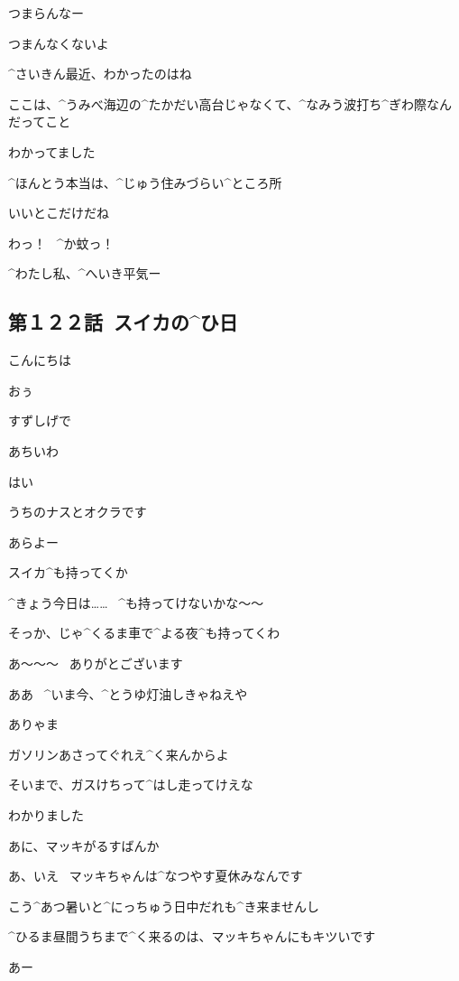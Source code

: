\Shiba つまらんなー

\Kokone つまんなくないよ

\page[17]
\Alpha ^{さいきん}{最近}、わかったのはね

\Alpha ここは、^{うみべ}{海辺}の^{たかだい}{高台}じゃなくて、^{なみう}{波打}ち^{ぎわ}{際}なんだってこと

\Makki わかってました

\Alpha ^{ほんとう}{本当}は、^{じゅう}{住}みづらい^{ところ}{所}

\Makki いいとこだけだね

\page
\Makki わっ！
\ ^{か}{蚊}っ！

\Alpha ^{わたし}{私}、^{へいき}{平気}ー


\subsection{第１２２話\ スイカの^{ひ}{日}}

\page[21]
\Alpha こんにちは

\Ojisan おぅ

\Alpha すずしげで

\Ojisan あちいわ

\Alpha はい

\Alpha うちのナスとオクラです

\Ojisan あらよー

\page
\Ojisan スイカ^{も}{持}ってくか

\Alpha ^{きょう}{今日}は……
\ ^{も}{持}ってけないかな〜〜

\Ojisan そっか、じゃ^{くるま}{車}で^{よる}{夜}^{も}{持}ってくわ

\Alpha あ〜〜〜
\ ありがとございます

\Ojisan ああ
\ ^{いま}{今}、^{とうゆ}{灯油}しきゃねえや

\Alpha ありゃま

\Ojisan ガソリンあさってぐれえ^{く}{来}んからよ

\Ojisan そいまで、ガスけちって^{はし}{走}ってけえな

\Alpha わかりました

\page[24]
\Ojisan あに、マッキがるすばんか

\Alpha あ、いえ
\ マッキちゃんは^{なつやす}{夏休}みなんです

\Alpha こう^{あつ}{暑}いと^{にっちゅう}{日中}だれも^{き}{来}ませんし

\Alpha ^{ひるま}{昼間}うちまで^{く}{来}るのは、マッキちゃんにもキツいです

\Ojisan あー

